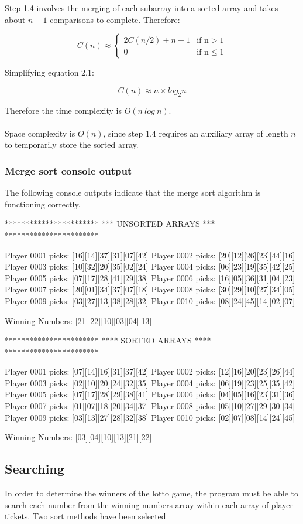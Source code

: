 Step 1.4 involves the merging of each subarray into a sorted array and takes about $n - 1$ comparisons to complete. Therefore:

\begin{equation}
C(n) \approx \left\{\begin{matrix}
2C(n/2) + n - 1 & \mbox{if n} > 1 \\ 
0 & \mbox{if n} \leq 1 
\end{matrix}\right.
\end{equation}

\newpage
Simplifying equation 2.1:

\begin{equation}
C(n) \approx n \times log_2n
\end{equation}

Therefore the time complexity is $O(n \ log \ n)$.
\\
\\
Space complexity is $O(n)$, since step 1.4 requires an auxiliary array of length $n$ to temporarily store the sorted array.

\subsubsection{Merge sort console output}

The following console outputs indicate that the merge sort algorithm is functioning correctly.
\\
\begin{consolecode}
***********************
*** UNSORTED ARRAYS ***
***********************

Player 0001 picks: [16][14][37][31][07][42]
Player 0002 picks: [20][12][26][23][44][16]
Player 0003 picks: [10][32][20][35][02][24]
Player 0004 picks: [06][23][19][35][42][25]
Player 0005 picks: [07][17][28][41][29][38]
Player 0006 picks: [16][05][36][31][04][23]
Player 0007 picks: [20][01][34][37][07][18]
Player 0008 picks: [30][29][10][27][34][05]
Player 0009 picks: [03][27][13][38][28][32]
Player 0010 picks: [08][24][45][14][02][07]

Winning Numbers:   [21][22][10][03][04][13]
\end{consolecode}

\begin{consolecode}
***********************
**** SORTED ARRAYS ****
***********************

Player 0001 picks: [07][14][16][31][37][42]
Player 0002 picks: [12][16][20][23][26][44]
Player 0003 picks: [02][10][20][24][32][35]
Player 0004 picks: [06][19][23][25][35][42]
Player 0005 picks: [07][17][28][29][38][41]
Player 0006 picks: [04][05][16][23][31][36]
Player 0007 picks: [01][07][18][20][34][37]
Player 0008 picks: [05][10][27][29][30][34]
Player 0009 picks: [03][13][27][28][32][38]
Player 0010 picks: [02][07][08][14][24][45]

Winning Numbers:   [03][04][10][13][21][22]
\end{consolecode}

\subsection{Searching}

In order to determine the winners of the lotto game, the program must be able to search each number from the winning numbers array within each array of player tickets. Two sort methods have been selected

